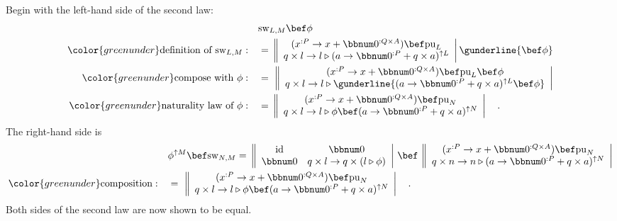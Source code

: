 Begin with the left-hand side of the second law:
\begin{align*}
 & \text{sw}_{L,M}\bef\phi\\
{\color{greenunder}\text{definition of }\text{sw}_{L,M}:}\quad & =\,\left\Vert \begin{array}{c}
(x^{:P}\rightarrow x+\bbnum 0^{:Q\times A})\bef\text{pu}_{L}\\
q\times l\rightarrow l\triangleright(a\rightarrow\bbnum 0^{:P}+q\times a)^{\uparrow L}
\end{array}\right|\gunderline{\bef\phi}\\
{\color{greenunder}\text{compose with }\phi:}\quad & =\,\,\left\Vert \begin{array}{c}
(x^{:P}\rightarrow x+\bbnum 0^{:Q\times A})\bef\text{pu}_{L}\bef\phi\\
q\times l\rightarrow l\triangleright\gunderline{(a\rightarrow\bbnum 0^{:P}+q\times a)^{\uparrow L}\bef\phi}
\end{array}\right|\\
{\color{greenunder}\text{naturality law of }\phi:}\quad & =\,\left\Vert \begin{array}{c}
(x^{:P}\rightarrow x+\bbnum 0^{:Q\times A})\bef\text{pu}_{N}\\
q\times l\rightarrow l\triangleright\phi\bef(a\rightarrow\bbnum 0^{:P}+q\times a)^{\uparrow N}
\end{array}\right|\quad.
\end{align*}
The right-hand side is
\begin{align*}
 & \phi^{\uparrow M}\bef\text{sw}_{N,M}=\,\left\Vert \begin{array}{cc}
\text{id} & \bbnum 0\\
\bbnum 0 & q\times l\rightarrow q\times\left(l\triangleright\phi\right)
\end{array}\right|\,\bef\,\left\Vert \begin{array}{c}
(x^{:P}\rightarrow x+\bbnum 0^{:Q\times A})\bef\text{pu}_{N}\\
q\times n\rightarrow n\triangleright(a\rightarrow\bbnum 0^{:P}+q\times a)^{\uparrow N}
\end{array}\right|\\
{\color{greenunder}\text{composition}:}\quad & =\,\,\left\Vert \begin{array}{c}
(x^{:P}\rightarrow x+\bbnum 0^{:Q\times A})\bef\text{pu}_{N}\\
q\times l\rightarrow l\triangleright\phi\bef(a\rightarrow\bbnum 0^{:P}+q\times a)^{\uparrow N}
\end{array}\right|\quad.
\end{align*}
Both sides of the second law are now shown to be equal.

